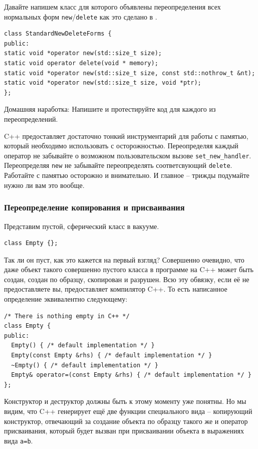 \documentclass[a4paper,12pt,oneside]{article}
\begin{document}
Давайте напишем класс для которого объявлены переопределения всех нормальных форм \lstinline!new!/\lstinline!delete! как это сделано в \cite{effcpp3d}.

\begin{lstlisting}
class StandardNewDeleteForms {
public:
static void *operator new(std::size_t size);
static void operator delete(void * memory);
static void *operator new(std::size_t size, const std::nothrow_t &nt);
static void *operator new(std::size_t size, void *ptr);
};
\end{lstlisting}

Домашняя наработка: 
Напишите и протестируйте код для каждого из переопределений.

C++ предоставляет достаточно тонкий инструментарий для работы с памятью, который необходимо использовать с осторожностью. Переопределяя каждый оператор не забывайте о возможном пользовательском вызове \lstinline!set_new_handler!. Переопределяя \lstinline!new! не забывайте переопределять соответсвующий \lstinline!delete!. Работайте с памятью осторожно и внимательно. И главное -- трижды подумайте нужно ли вам это вообще.

\subsubsection{Переопределение копирования и присваивания}

Представим пустой, сферический класс в вакууме.

\begin{lstlisting}
class Empty {};
\end{lstlisting}

Так ли он пуст, как это кажется на первый взгляд? Совершенно очевидно, что даже объект такого совершенно пустого класса в программе на C++ может быть создан, создан по образцу, скопирован и разрушен. Всю эту обвязку, если её не предоставляете вы, предоставляет компилятор C++. То есть написанное определение эквивалентно следующему:

\begin{lstlisting}
/* There is nothing empty in C++ */
class Empty {
public:
  Empty() { /* default implementation */ }
  Empty(const Empty &rhs) { /* default implementation */ }
  ~Empty() { /* default implementation */ }
  Empty& operator=(const Empty &rhs) { /* default implementation */ }
};
\end{lstlisting}

Конструктор и деструктор должны быть к этому моменту уже понятны. Но мы видим, что C++ генерирует ещё две функции специального вида – копирующий конструктор, отвечающий за создание объекта по образцу такого же и оператор присваивания, который будет вызван при присваивании объекта в выражениях вида \lstinline!a=b!.
\end{document}
